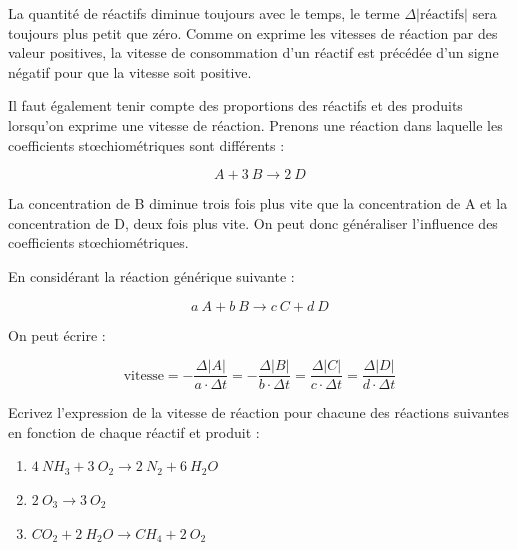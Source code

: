 \documentclass[
  11pt,
  french,
  a4paper,
  openany]{book}
\providecommand{\tightlist}{%
  \setlength{\itemsep}{0pt}\setlength{\parskip}{0pt}}
\begin{document}
La quantité de réactifs diminue toujours avec le temps, le terme \(\Delta |\text{réactifs}|\) sera toujours plus petit que zéro. Comme on exprime les vitesses de réaction par des valeur positives, la vitesse de consommation d'un réactif est précédée d'un signe négatif pour que la vitesse soit positive.

Il faut également tenir compte des proportions des réactifs et des produits lorsqu'on exprime une vitesse de réaction. Prenons une réaction dans laquelle les coefficients stœchiométriques sont différents :

\[
A + 3\ B \rightarrow 2\ D
\]

La concentration de B diminue trois fois plus vite que la concentration de A et la concentration de D, deux fois plus vite. On peut donc généraliser l'influence des coefficients stœchiométriques.

\newpage

En considérant la réaction générique suivante :

\[
a\ A + b\ B \rightarrow c\ C + d\ D
\]

On peut écrire :

\[
\text{vitesse} = - \frac{\Delta |A|}{a \cdot \Delta t} = - \frac{\Delta |B|}{b \cdot \Delta t} = \frac{\Delta |C|}{c \cdot \Delta t} = \frac{\Delta |D|}{d \cdot \Delta t}
\]

\begin{Exercise}

Ecrivez l'expression de la vitesse de réaction pour chacune des réactions suivantes en fonction de chaque réactif et produit :

\begin{enumerate}
\def\labelenumi{\arabic{enumi}.}
\tightlist
\item
  \(4\ NH_3 + 3\ O_2 \rightarrow 2\ N_2 + 6\ H_2O\)
\item
  \(2\ O_3 \rightarrow 3\ O_2\)
\item
  \(CO_2 + 2\ H_2O \rightarrow CH_4 + 2\ O_2\)
\end{enumerate}


\end{Exercise}
\end{document}
